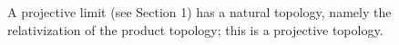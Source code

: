A projective limit (see Section 1) has a natural topology, namely the relativization of the product topology; this is a projective topology.
